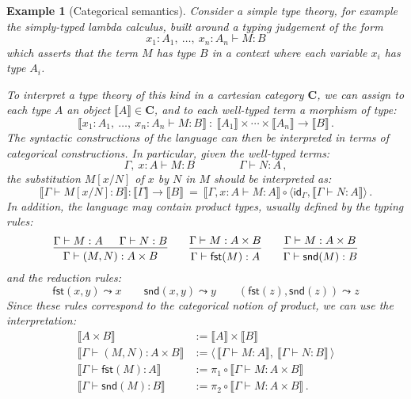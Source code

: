 \documentclass[11pt,oneside]{book}
\newtheorem{example}[theorem]{Example}
\theoremstyle{definition}
\newcommand{\kw}[1]{\ensuremath{ \mathsf{#1} }}
\begin{document}
\begin{example}[Categorical semantics] \label{ex:ttcc} %
Consider a simple type theory,
for example the simply-typed lambda calculus,
built around a typing judgement of the form
\[
  x_1 : A_1, \: \ldots, \: x_n : A_n \vdash M : B
\]
which asserts that the term $M$ has type $B$
in a context where each variable $x_i$
has type $A_i$.

To interpret a type theory of this kind in
a cartesian category $\mathbf{C}$,
we can assign to each type $A$
an object $\llbracket A \rrbracket \in \mathbf{C}$,
and to each well-typed term a morphism of type:
\[
  \llbracket x_1 : A_1, \: \ldots, \: x_n : A_n \vdash M : B \rrbracket
  \: : \:
  \llbracket A_1 \rrbracket \times \cdots \times
  \llbracket A_n \rrbracket \rightarrow
  \llbracket B \rrbracket
  \,.
\]
The syntactic constructions of the language
can then be interpreted in terms of
categorical constructions.
In particular,
given the well-typed terms:
\[
  \Gamma, \: x : A \vdash M : B
  \qquad \qquad
  \Gamma \vdash N : A
  \,,
\]
the substitution $M[x/N]$ of $x$ by $N$ in $M$
should be interpreted as:
\[
  \llbracket \Gamma \vdash M[x/N] : B \rrbracket
  :
  \llbracket \Gamma \rrbracket \rightarrow \llbracket B \rrbracket
  \: = \:
  \llbracket \Gamma, x:A \vdash M : A \rrbracket \circ
  \langle
    \kw{id}_\Gamma,
    \llbracket \Gamma \vdash N : A \rrbracket
  \rangle
  \,.
\]
In addition,
the language may contain product types,
usually defined by the typing rules:
\[
  \begin{prooftree}
    \hypo{\Gamma \vdash M : A}
    \hypo{\Gamma \vdash N : B}
    \infer2{\Gamma \vdash (M, N) : A \times B}
  \end{prooftree}
  \qquad
  \begin{prooftree}
    \hypo{\Gamma \vdash M : A \times B}
    \infer1{\Gamma \vdash \kw{fst}(M) : A}
  \end{prooftree}
  \qquad
  \begin{prooftree}
    \hypo{\Gamma \vdash M : A \times B}
    \infer1{\Gamma \vdash \kw{snd}(M) : B}
  \end{prooftree}
\]
and the reduction rules:
\[
  \kw{fst}(x, y) \leadsto x
  \qquad
  \kw{snd}(x, y) \leadsto y
  \qquad
  (\kw{fst}(z), \kw{snd}(z)) \leadsto z
\]
Since these rules correspond to the categorical notion of product,
we can use the interpretation:
\begin{align*}
  \llbracket A \times B \rrbracket &:=
    \llbracket A \rrbracket \times \llbracket B \rrbracket \\
  \llbracket \Gamma \vdash (M, N) : A \times B \rrbracket &:=
    \langle \,
      \llbracket \Gamma \vdash M : A \rrbracket, \:
      \llbracket \Gamma \vdash N : B \rrbracket \,
    \rangle \\
  \llbracket \Gamma \vdash \kw{fst}(M) : A \rrbracket &:=
    \pi_1 \circ \llbracket \Gamma \vdash M : A \times B \rrbracket \\
  \llbracket \Gamma \vdash \kw{snd}(M) : B \rrbracket &:=
    \pi_2 \circ \llbracket \Gamma \vdash M : A \times B \rrbracket
  \,.
\end{align*}
\end{example}
\end{document}
